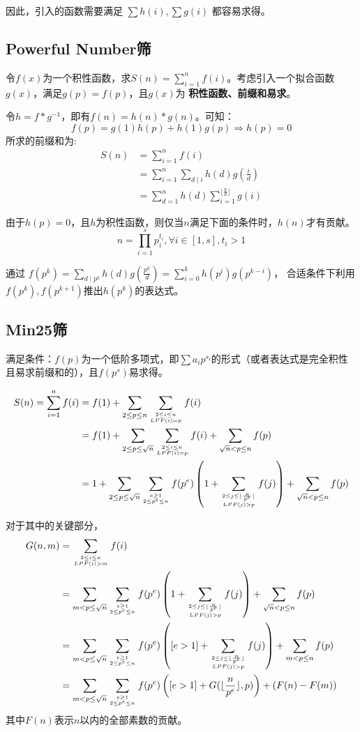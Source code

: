 因此，引入的函数需要满足 $\sum{h(i)},\sum{g(i)}$ 都容易求得。

\subsection{Powerful Number筛}
令$f(x)$为一个积性函数，求$S(n)=\sum_{i=1}^{n}f(i)$。考虑引入一个拟合函数$g(x)$，满足$g(p)=f(p)$，且$g(x)$为 \textbf{积性函数、前缀和易求}。

令$h=f*g^{-1}$，即有$f(n)=h(n)*g(n)$。可知：
\[ f(p)=g(1)h(p)+h(1)g(p) \Rightarrow h(p)=0 \]
所求的前缀和为:
\[
  \begin{aligned}
    S(n) 
    &= \sum_{i=1}^{n}f(i) \\
    &= \sum_{i=1}^{n}\sum_{d\mid i}h(d)g(\frac{i}{d}) \\
    &= \sum_{d=1}^{n}h(d)\sum_{i=1}^{\lfloor\frac{n}{d}\rfloor}g(i)
  \end{aligned}
\]

由于$h(p)=0$，且$h$为积性函数，则仅当$n$满足下面的条件时，$h(n)$才有贡献。
\[ n=\prod_{i=1}^{s} p_i^{t_i},\forall i \in [1, s],t_i>1 \]

通过 $f(p^k)=\sum_{d\mid p^k}h(d)g(\frac{p^k}{d})=\sum_{i=0}^{k}h(p^i)g(p^{k-i})$，
合适条件下利用$f(p^k),f(p^{k+1})$推出$h(p^k)$的表达式。

\subsection{Min25筛}

满足条件：$f(p)$为一个低阶多项式，即$\sum a_ip^{s_i}$的形式（或者表达式是完全积性且易求前缀和的），且$f(p^s)$易求得。

\[
  \begin{aligned}
  S(n)=\sum_{i=1}^{n}{f(i)}
  &=f(1)+\sum_{2\leq p\leq n}\sum_{2\leq i\leq n \atop LPF(i)=p}{f(i)} \\
  &=f(1)+\sum_{2\leq p\leq \sqrt n}\sum_{2\leq i\leq n \atop LPF(i)=p}{f(i)}+\sum_{\sqrt n < p\leq n}{f(p)} \\
  &=1+\sum_{2\leq p\leq \sqrt n}\sum_{e\geq 1 \atop 2\leq p^e \leq n}{f(p^e)}\left(1 + \sum_{2\leq j\leq \lfloor \frac{n}{p^e} \rfloor \atop LPF(j)>p}{f(j)} \right)+\sum_{\sqrt n<p\leq n}{f(p)} \\
  \end{aligned}
\]

对于其中的关键部分，
\[
  \begin{aligned}
  G(n,m)
  &=\sum_{2\leq i\leq n \atop LPF(i)>m}{f(i)} \\
  &=\sum_{m<p\leq \sqrt n}\sum_{e\geq 1 \atop 2\leq p^e\leq n}f(p^e)\left(1+\sum_{2\leq j\leq \lfloor\frac{n}{p^e} \rfloor \atop LPF(j)>p}f(j) \right) +\sum_{\sqrt n < p\leq n}{f(p)}  \\
  &=\sum_{m<p\leq\sqrt n}\sum_{e\geq 1 \atop 2\leq p^e\leq n}{f(p^e)}\left([e>1]+ \sum_{2\leq j\leq \lfloor\frac{n}{p^e} \rfloor \atop LPF(j)>p}{f(j)} \right)+\sum_{m<p\leq n}f(p) \\
  &=\sum_{m<p\leq\sqrt n}\sum_{e\geq 1 \atop 2\leq p^e\leq n}{f(p^e)}\left([e>1]+G(\lfloor \frac{n}{p^e} \rfloor,p) \right)+\left(F(n)-F(m)\right) \\
  \end{aligned}
\]
其中$F(n)$表示$n$以内的全部素数的贡献。

